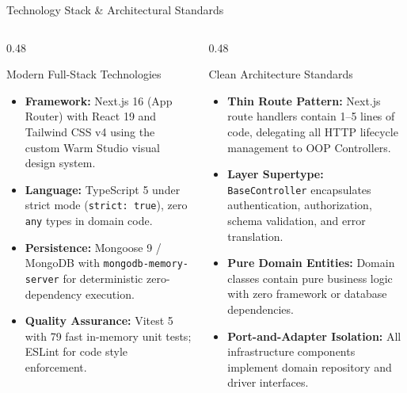 ﻿\documentclass[aspectratio=169,10pt,t]{beamer}
\begin{document}
\begin{frame}{Technology Stack \& Architectural Standards}
  \vspace{0.5mm}
  \begin{columns}[T]
    \begin{column}{0.48\textwidth}
      \begin{infoCard}{Modern Full-Stack Technologies}
        \begin{itemize}\setlength{\itemsep}{1.2pt}\setlength{\parskip}{0pt}\setlength{\leftmargini}{8pt}
          \item \textbf{Framework:} Next.js 16 (App Router) with React 19 and Tailwind CSS v4 using the custom Warm Studio visual design system.
          \item \textbf{Language:} TypeScript 5 under strict mode (\texttt{strict: true}), zero \texttt{any} types in domain code.
          \item \textbf{Persistence:} Mongoose 9 / MongoDB with \texttt{mongodb-memory-server} for deterministic zero-dependency execution.
          \item \textbf{Quality Assurance:} Vitest 5 with 79 fast in-memory unit tests; ESLint for code style enforcement.
        \end{itemize}
      \end{infoCard}
    \end{column}

    \begin{column}{0.48\textwidth}
      \begin{infoCard}{Clean Architecture Standards}
        \begin{itemize}\setlength{\itemsep}{1.2pt}\setlength{\parskip}{0pt}\setlength{\leftmargini}{8pt}
          \item \textbf{Thin Route Pattern:} Next.js route handlers contain 1--5 lines of code, delegating all HTTP lifecycle management to OOP Controllers.
          \item \textbf{Layer Supertype:} \texttt{BaseController} encapsulates authentication, authorization, schema validation, and error translation.
          \item \textbf{Pure Domain Entities:} Domain classes contain pure business logic with zero framework or database dependencies.
          \item \textbf{Port-and-Adapter Isolation:} All infrastructure components implement domain repository and driver interfaces.
        \end{itemize}
      \end{infoCard}
    \end{column}
  \end{columns}


\end{frame}
\end{document}
